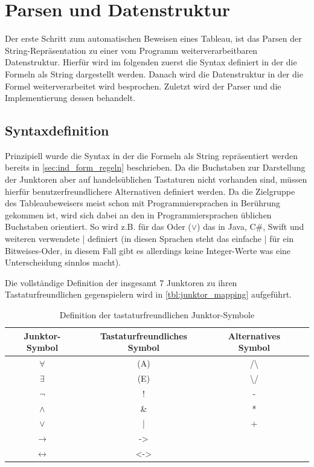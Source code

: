 
\chapter{\label{sec:parsen}Parsen und Datenstruktur}
Der erste Schritt zum automatischen Beweisen eines Tableau, ist das Parsen der String-Repräsentation zu einer vom Programm weiterverarbeitbaren Datenstruktur. Hierfür wird im folgenden zuerst die Syntax definiert in der die Formeln als String dargestellt werden. Danach wird die Datenstruktur in der die Formel weiterverarbeitet wird besprochen. Zuletzt wird der Parser und die Implementierung dessen behandelt.

\section{\label{sec:syntaxdef}Syntaxdefinition}
Prinzipiell wurde die Syntax in der die Formeln als String repräsentiert werden bereits in \autoref{sec:ind_form_regeln} beschrieben. Da die Buchstaben zur Darstellung der Junktoren aber auf handelsüblichen Tastaturen nicht vorhanden sind, müssen hierfür benutzerfreundlichere Alternativen definiert werden. Da die Zielgruppe des Tableaubeweisers meist schon mit Programmiersprachen in Berührung gekommen ist, wird sich dabei an den in Programmiersprachen üblichen Buchstaben orientiert. So wird z.B. für das Oder ($\vee$) das in Java, C\#, Swift und weiteren verwendete | definiert (in diesen Sprachen steht das einfache | für ein Bitweises-Oder, in diesem Fall gibt es allerdings keine Integer-Werte was eine Unterscheidung sinnlos macht).

Die vollständige Definition der insgesamt 7 Junktoren zu ihren Tastaturfreundlichen gegenspielern wird in \autoref{tbl:junktor_mapping} aufgeführt.
\begin{table}[h]
\begin{center}
\begin{tabular}{|c|c|c|c|}
\hline
Junktor-Symbol & Tastaturfreundliches Symbol & Alternatives Symbol \\
\hline
$\forall$ & (A) & /\textbackslash \\
\hline
$\exists$ & (E) & \textbackslash/ \\
\hline
$\neg$ & ! & - \\
\hline
$\wedge$ & \& & * \\
\hline
$\vee$ & | & + \\
\hline
$\rightarrow$ & -> & \\
\hline
$\leftrightarrow$ & <-> & \\
\hline
\end{tabular}
\end{center}
\caption{\label{tbl:junktor_mapping}Definition der tastaturfreundlichen Junktor-Symbole}
\end{table}

